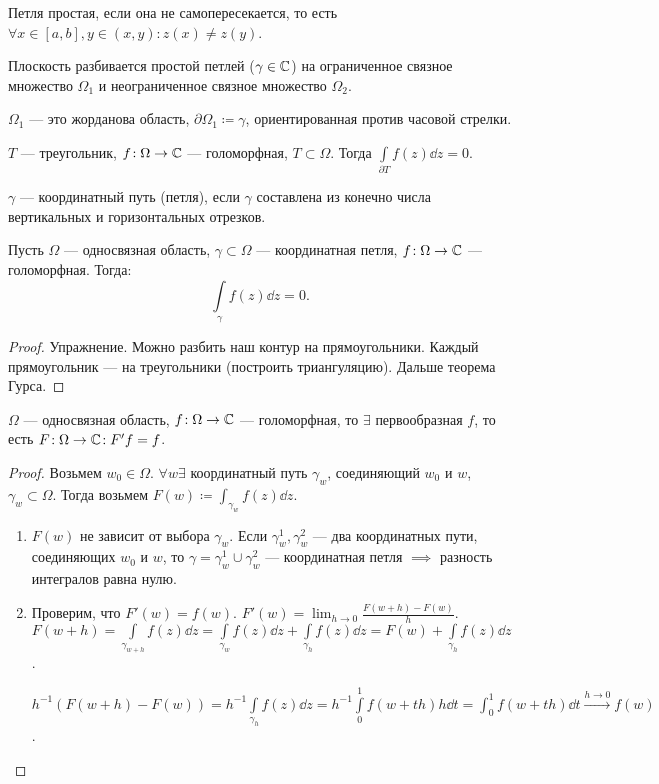 \begin{definition}
    Петля простая, если она не самопересекается, то есть $\forall x \in [a, b], y \in (x, y)\!: z(x) \neq z(y)$.
\end{definition}
\begin{theorem}
    Плоскость разбивается простой петлей ($\gamma \in \mathbb{C}$) на ограниченное связное множество $\Omega_1$ и неограниченное связное множество $\Omega_2$.
\end{theorem}
\begin{definition}
    $\Omega_1$ --- это жорданова область, $\partial \Omega_1 \coloneqq \gamma$, ориентированная против часовой стрелки.
\end{definition}
\begin{theorem}[Гурса]
    $T$ --- треугольник,  $f\!: \Omega \to \mathbb{C}$ --- голоморфная,  $T \subset \Omega$. Тогда  $\int\limits_{\partial T} f(z) \dd{z} = 0$.
\end{theorem}
\begin{definition}
    $\gamma$ --- координатный путь (петля), если  $\gamma$ составлена из конечно числа вертикальных и горизонтальных отрезков.
\end{definition}
\begin{lemma}
    Пусть $\Omega$ --- односвязная область,  $\gamma \subset \Omega$ --- координатная петля, $f\!: \Omega \to \mathbb{C}$ --- голоморфная. Тогда:
    \[
        \int\limits_\gamma f(z)\dd{z} = 0
    .\] 
\end{lemma}
\begin{proof}
    Упражнение. Можно разбить наш контур на прямоугольники. Каждый прямоугольник --- на треугольники (построить триангуляцию). Дальше теорема Гурса.
\end{proof}
\begin{theorem}
    $\Omega$ --- односвязная область,  $f\!: \Omega \to \mathbb{C}$ --- голоморфная, то  $\exists$ первообразная  $f$, то есть  $F\!: \Omega \to \mathbb{C}\!: F'f = f$.
\end{theorem}
\begin{proof}
    Возьмем $w_0 \in \Omega$.  $\forall w \exists $ координатный путь  $\gamma_w$, соединяющий  $w_0$ и  $w$,  $\gamma_w \subset \Omega$. Тогда возьмем  $F(w) \coloneqq \int_{\gamma_w} f(z) \dd{z}$.
    \begin{enumerate}
        \item $F(w)$ не зависит от выбора  $\gamma_w$. Если  $\gamma_w^1, \gamma_w^2$ --- два координатных пути, соединяющих  $w_0$ и  $w$, то  $\gamma = \gamma_w^1 \cup \gamma_w^2$ --- координатная петля  $\implies$ разность интегралов равна нулю.
        \item Проверим, что  $F'(w) = f(w)$.  $F'(w) = \lim_{h \to 0} \frac{F(w+h) - F(w)}{h}$.  $F(w + h) = \int\limits_{\gamma_{w+h}}f(z) \dd{z} = \int\limits_{\gamma_w} f(z) \dd{z} + \int\limits_{\gamma_h}f(z) \dd{z} = F(w) + \int\limits_{\gamma_h} f(z) \dd{z}$.

            $h^{-1}\left( F(w+h) - F(w) \right) = h^{-1}\int\limits_{\gamma_h}f(z)\dd{z} = h^{-1}\int\limits_0^1 f(w + th)h\dd{t} = \int_0^1 f(w + th) \dd{t} \xrightarrow{h \to 0} f(w)$.
    \end{enumerate}
\end{proof}
